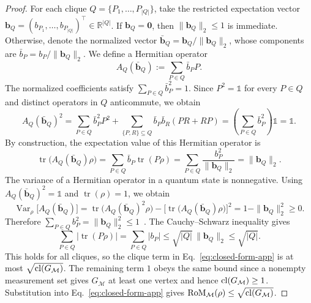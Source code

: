 \documentclass[10pt,aps,pra,twocolumn,floatfix,nofootinbib,superscriptaddress,longbibliography]{revtex4-2}
\newcommand{\Mcal}{\mathcal M}
\newcommand{\RoM}{\mathrm{RoM}}
\renewcommand{\tr}{\operatorname{tr}}
\providecommand{\mathbm}[1]{\bm{#1}}
\begin{document}
\begin{bibunit}[apsrev4-2]
\begin{proof}
			For each clique $Q=\{P_1,\dots,P_{|Q|}\}$, take the restricted expectation vector $\mathbm{b}_Q=(b_{P_1},\dots,b_{P_{|Q|}})^\top\in\mathbb{R}^{|Q|}$. If $\mathbm{b}_Q=\mathbm{0}$, then $\|\mathbm{b}_Q\|_2\le1$ is immediate. Otherwise, denote the normalized vector $\bar{\mathbm{b}}_Q=\mathbm{b}_Q/\|\mathbm{b}_Q\|_2$, whose components are $\bar b_P=b_P/\|\mathbm{b}_Q\|_2$. We define a Hermitian operator
			\begin{equation}
				\displaystyle
				A_Q(\bar{\mathbm{b}}_Q):=\sum_{P\in Q}\bar b_P P.
			\end{equation}
			The normalized coefficients satisfy $\sum_{P\in Q}\bar b_P^2=1$. Since $P^2=\mathbb{1}$ for every $P\in Q$ and distinct operators in $Q$ anticommute, we obtain
			\begin{equation}
				\displaystyle
				A_Q(\bar{\mathbm{b}}_Q)^2
				=\sum_{P\in Q}\bar b_P^2P^2
				+\sum_{\{P,R\}\subseteq Q}\bar b_P\bar b_R(PR+RP)
				=\left(\sum_{P\in Q}\bar b_P^2\right)\mathbb{1}
				=\mathbb{1}.
			\end{equation}
			By construction, the expectation value of this Hermitian operator is
			\begin{equation}
				\displaystyle
				\tr\!\big(A_Q(\bar{\mathbm{b}}_Q)\rho\big)
				=\sum_{P\in Q}\bar b_P\tr(P\rho)
				=\sum_{P\in Q}\frac{b_P^2}{\|\mathbm{b}_Q\|_2}
				=\|\mathbm{b}_Q\|_2.
			\end{equation}
			The variance of a Hermitian operator in a quantum state is nonnegative. Using $A_Q(\bar{\mathbm{b}}_Q)^2=\mathbb{1}$ and $\tr(\rho)=1$, we obtain
			\begin{equation}
				\displaystyle
				\operatorname{Var}_{\rho}\!\big[A_Q(\bar{\mathbm{b}}_Q)\big]
				=\tr\!\big(A_Q(\bar{\mathbm{b}}_Q)^2\rho\big)
				-\Big[\tr\!\big(A_Q(\bar{\mathbm{b}}_Q)\rho\big)\Big]^2
				=1-\|\mathbm{b}_Q\|_2^2\geq 0.
			\end{equation}
			Therefore $\sum_{P\in Q}b_P^2=\|\mathbm{b}_Q\|_2^2\le1$~\cite{cabello2014graph,xu2024bounding}. The Cauchy--Schwarz inequality gives
			\begin{equation}
				\displaystyle
				\sum_{P\in Q}|\tr(P\rho)|
				=\sum_{P\in Q}|b_P|
				\le\sqrt{|Q|}\,\|\mathbm{b}_Q\|_2
				\le\sqrt{|Q|}.
			\end{equation}
			This holds for all cliques, so the clique term in Eq.~\eqref{eq:closed-form-app} is at most $\sqrt{\clnum(G_\Mcal)}$. The remaining term $1$ obeys the same bound since a nonempty measurement set gives $G_\Mcal$ at least one vertex and hence $\clnum(G_\Mcal)\ge1$. Substitution into Eq.~\eqref{eq:closed-form-app} gives $\RoM_\Mcal(\rho)\le\sqrt{\clnum(G_\Mcal)}$.
			

\end{proof}
\end{bibunit}
\end{document}
